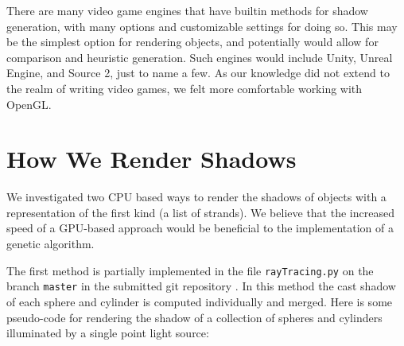 \documentclass[10pt]{article}
\begin{document}
There are many video game engines that have builtin methods for shadow generation, with many options and customizable settings for doing so.  This may be the simplest option for rendering objects, and potentially would allow for comparison and heuristic generation.  Such engines would include Unity, Unreal Engine, and Source 2, just to name a few.  As our knowledge did not extend to the realm of writing video games, we felt more comfortable working with OpenGL.

\section{How We Render Shadows}
We investigated two CPU based ways to render the shadows of objects with a representation of the first kind (a list of strands). We believe that the increased speed of a GPU-based approach would be beneficial to the implementation of a genetic algorithm.

The first method is partially implemented in the file \texttt{rayTracing.py} on the branch \texttt{master} in the submitted git repository \cite{gitrepo}. In this method the cast shadow of each sphere and cylinder is computed individually and merged. Here is some pseudo-code for rendering the shadow of a collection of spheres and cylinders illuminated by a single point light source:
\end{document}
